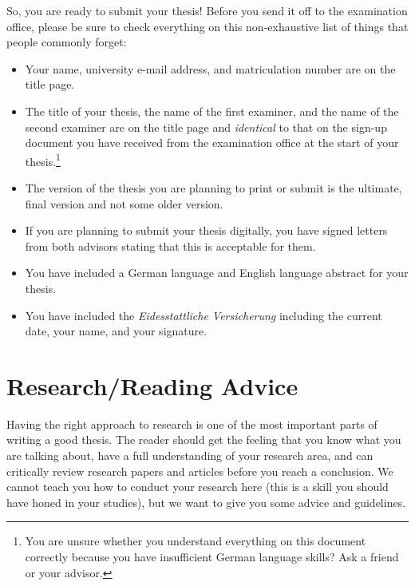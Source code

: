 \documentclass[a4]{article}
\begin{document}
So, you are ready to submit your thesis!
Before you send it off to the examination office, please be sure to check everything on this non-exhaustive list of things that people commonly forget:

\begin{itemize}
    \item Your name, university e-mail address, and matriculation number are on the title page.
    \item The title of your thesis, the name of the first examiner, and the name of the second examiner are on the title page and \emph{identical} to that on the sign-up document you have received from the examination office at the start of your thesis.\footnote{You are unsure whether you understand everything on this document correctly because you have insufficient German language skills? Ask a friend or your advisor.}
    \item The version of the thesis you are planning to print or submit is the ultimate, final version and not some older version.
    \item If you are planning to submit your thesis digitally, you have signed letters from both advisors stating that this is acceptable for them.
    \item You have included a German language and English language abstract for your thesis.
    \item You have included the \emph{Eidesstattliche Versicherung} including the current date, your name, and your signature.
\end{itemize}

\section{Research/Reading Advice}
\label{sec:research}

Having the right approach to research is one of the most important parts of writing a good thesis.
The reader should get the feeling that you know what you are talking about, have a full understanding of your research area, and can critically review research papers and articles before you reach a conclusion.
We cannot teach you how to conduct your research here (this is a skill you should have honed in your studies), but we want to give you some advice and guidelines.
\end{document}
